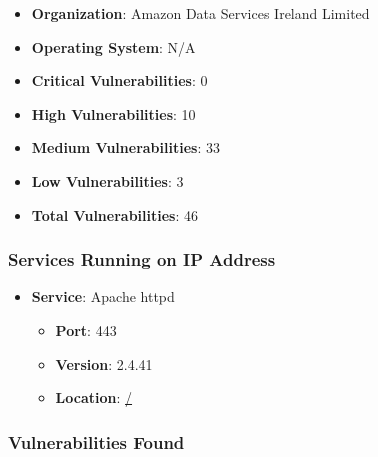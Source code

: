 \documentclass{article}
\begin{document}
\begin{itemize}
    \item \textbf{Organization}: Amazon Data Services Ireland Limited
    \item \textbf{Operating System}:  N/A 
    \item \textbf{Critical Vulnerabilities}: 0
    \item \textbf{High Vulnerabilities}: 10
    \item \textbf{Medium Vulnerabilities}: 33
    \item \textbf{Low Vulnerabilities}: 3
    \item \textbf{Total Vulnerabilities}: 46
\end{itemize}

\subsubsection*{Services Running on IP Address}

\begin{itemize}
    
        \item \textbf{Service}: Apache httpd
        \begin{itemize}
            \item \textbf{Port}: 443
            \item \textbf{Version}:  2.4.41 
            \item \textbf{Location}: \href{ / }{ / }
        \end{itemize}
    
\end{itemize}


\subsubsection*{Vulnerabilities Found}
\end{document}
